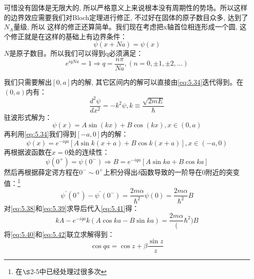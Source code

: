 \documentclass[a4paper,zihao=-4,linespread=1]{ctexrep}
\begin{document}
    可惜没有固体是无限大的, 所以严格意义上来说根本没有周期性的势场。所以这样的边界效应需要我们对Bloch定理进行修正, 不过好在固体的原子数目众多, 达到了$N_A$量级, 所以
    这样的修正还算简单。我们现在考虑把x轴首位相连形成一个圆, 这个修正就是在这样的基础上有边界条件：
    \begin{equation}
        \psi(x+Na)=\psi(x)
    \end{equation}
    $N$是原子数目。所以我们可以得到q必须满足：
    \begin{equation}
        \label{eq:5.36}
        e^{iqNa}=1\Rightarrow q=\frac{n\pi}{Na},(n=0,\pm 1,\pm 2,\ldots)
    \end{equation}
    
    我们只需要解出$[0,a]$内的解, 其它区间内的解可以直接由\ref{eq:5.34}迭代得到。在$(0,a)$内有：
    \begin{equation}
        \frac{d^2\psi}{dx^2}=-k^2\psi,k\equiv\frac{\sqrt{2mE}}{\hbar}
    \end{equation}
    驻波形式解为：
    \begin{equation}
        \label{eq:5.38}
        \psi(x)=A\sin(kx)+B\cos(kx),x\in(0,a)
    \end{equation}
    再利用\ref{eq:5.34}我们得到$[-a,0]$内的解：
    \begin{equation}
        \label{eq:5.39}
       \psi(x)=e^{-iqa}\left[A\sin k(x+a)+B\cos k(x+a)\right] ,x\in(-a,0)
    \end{equation}
    再根据波函数在$x=0$处的连续性：
    \begin{equation}
        \label{eq:5.40}
        \psi(0^+)=\psi(0^-)\Rightarrow B=e^{-iqa}\left[A\sin ka+B\cos ka\right]
    \end{equation}
    然后再根据薛定谔方程在$0^-\sim 0^+$上积分得出$\delta$函数导致的一阶导在$0$附近的突变值：\footnote{在$\S$2-5中已经处理过很多次}
    \begin{equation}
        \label{eq:5.41}
        \psi^\prime(0^+)-\psi^\prime(0^-)=\frac{2m\alpha}{\hbar^2}\psi(0)=\frac{2m\alpha}{\hbar^2}B
    \end{equation}
    对\ref{eq:5.38}和\ref{eq:5.39}求导后代入\ref{eq:5.41}得：
    \begin{equation}
        \label{eq:5.42}
        kA-e^{-iqa}k\left(A \cos ka-B\sin ka\right)=\frac{2m\alpha}(\hbar^2) B
    \end{equation}
    将\ref{eq:5.40}和\ref{eq:5.42}联立求解得到：
    \begin{equation}
        \label{eq:5.43}
        \cos qa=\cos z+\beta\frac{\sin z}{z}
    \end{equation}
\end{document}
